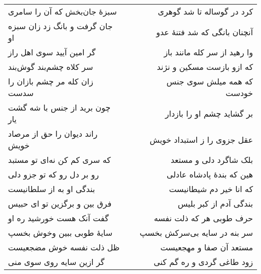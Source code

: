 \begin{center}
\begin{longtable}{l p{0.5cm} r}
سبزهٔ جان‌بخش که آن را سامری
&&
کرد در گوساله تا شد گوهری
\\
جان گرفت و بانگ زد زان سبزه او
&&
آنچنان بانگی که شد فتنهٔ عدو
\\
گر امین آیید سوی اهل راز
&&
وا رهید از سر کله مانند باز
\\
سر کلاه چشم‌بند گوش‌بند
&&
که ازو بازست مسکین و نژند
\\
زان کله مر چشم بازان را سدست
&&
که همه میلش سوی جنس خودست
\\
چون برید از جنس با شه گشت یار
&&
بر گشاید چشم او را بازدار
\\
راند دیوان را حق از مرصاد خویش
&&
عقل جزوی را ز استبداد خویش
\\
که سری کم کن نه‌ای تو مستبد
&&
بلک شاگرد دلی و مستعد
\\
رو بر دل رو که تو جزو دلی
&&
هین که بندهٔ پادشاه عادلی
\\
بندگی او به از سلطانیست
&&
که انا خیر دم شیطانیست
\\
فرق بین و برگزین تو ای حبیس
&&
بندگی آدم از کبر بلیس
\\
گفت آنک هست خورشید ره او
&&
حرف طوبی هر که ذلت نفسه
\\
سایهٔ طوبی ببین وخوش بخسپ
&&
سر بنه در سایه بی‌سرکش بخسپ
\\
ظل ذلت نفسه خوش مضجعیست
&&
مستعد آن صفا و مهجعیست
\\
گر ازین سایه روی سوی منی
&&
زود طاغی گردی و ره گم کنی
\\
\end{longtable}
\end{center}
